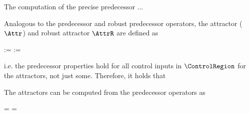     The computation of the precise predecessor ... %

\stopsection


\startsubsection[title={Attractors}]

    Analogous to the predecessor and robust predecessor operators, the attractor ($\Attr$) and robust attractor $\AttrR$ are defined as

    \startformula
        \startalign[n=2,align={right,left}]
            \NC {} :=
            \NC {} \EndAnd
            \NR
            \NC {} :=
            \NC {} \EndComma
            \NR
        \stopalign
    \stopformula

    i.e. the predecessor properties hold for all control inputs in $\ControlRegion$ for the attractors, not just some.
    Therefore, it holds that

    \startformula
        \startalign[n=2,align={right,left}]
            \NC {} \subseteq
            \NC {} \EndComma
            \NR
            \NC {} \subseteq
            \NC {} \EndAnd
            \NR
            \NC {} \subseteq
            \NC {} \EndPeriod
            \NR
        \stopalign
    \stopformula

    The attractors can be computed from the predecessor operators as

    \startformula
        \startalign[n=2,align={right,left}]
            \NC {} =
            \NC \StateRegion \setminus {} \EndComma
            \NR
            \NC {} =
            \NC \StateRegion \setminus {} \EndPeriod
            \NR
        \stopalign
    \stopformula

